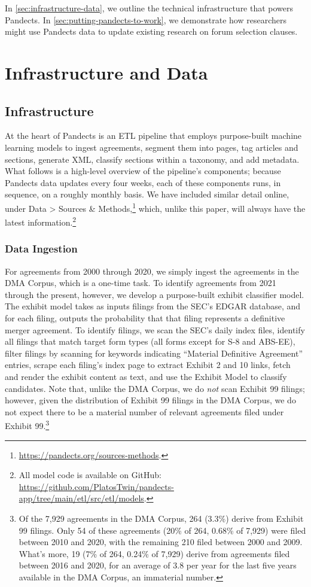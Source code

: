 \documentclass[12pt]{article}
\begin{document}
In \autoref{sec:infrastructure-data}, we outline the technical infrastructure that powers Pandects. In \autoref{sec:putting-pandects-to-work}, we demonstrate how researchers might use Pandects data to update existing research on forum selection clauses.

\section{Infrastructure and Data}\label{sec:infrastructure-data}

\subsection{Infrastructure}\label{sec:infrastructure}
At the heart of Pandects is an ETL pipeline that employs purpose-built machine learning models to ingest agreements, segment them into pages, tag articles and sections, generate XML, classify sections within a taxonomy, and add metadata. What follows is a high-level overview of the pipeline’s components; because Pandects data updates every four weeks, each of these components runs, in sequence, on a roughly monthly basis. We have included similar detail online, under Data \textgreater{} Sources \& Methods,\footnote{\url{https://pandects.org/sources-methods}.} which, unlike this paper, will always have the latest information.\footnote{All model code is available on GitHub: \url{https://github.com/PlatosTwin/pandects-app/tree/main/etl/src/etl/models}.}

\subsubsection{Data Ingestion}\label{sec:data-ingestion}
For agreements from 2000 through 2020, we simply ingest the agreements in the DMA Corpus, which is a one-time task. To identify agreements from 2021 through the present, however, we develop a purpose-built exhibit classifier model. The exhibit model takes as inputs filings from the SEC’s EDGAR database, and for each filing, outputs the probability that that filing represents a definitive merger agreement. To identify filings, we scan the SEC's daily index files, identify all filings that match target form types (all forms except for S-8 and ABS-EE), filter filings by scanning for keywords indicating ``Material Definitive Agreement'' entries, scrape each filing's index page to extract Exhibit 2 and 10 links, fetch and render the exhibit content as text, and use the Exhibit Model to classify candidates. Note that, unlike the DMA Corpus, we do \emph{not} scan Exhibit 99 filings; however, given the distribution of Exhibit 99 filings in the DMA Corpus, we do not expect there to be a material number of relevant agreements filed under Exhibit 99.\footnote{Of the 7,929 agreements in the DMA Corpus, 264 (3.3\%) derive from Exhibit 99 filings. Only 54 of these agreements (20\% of 264, 0.68\% of 7,929) were filed between 2010 and 2020, with the remaining 210 filed between 2000 and 2009. What's more, 19 (7\% of 264, 0.24\% of 7,929) derive from agreements filed between 2016 and 2020, for an average of 3.8 per year for the last five years available in the DMA Corpus, an immaterial number.}
\end{document}
